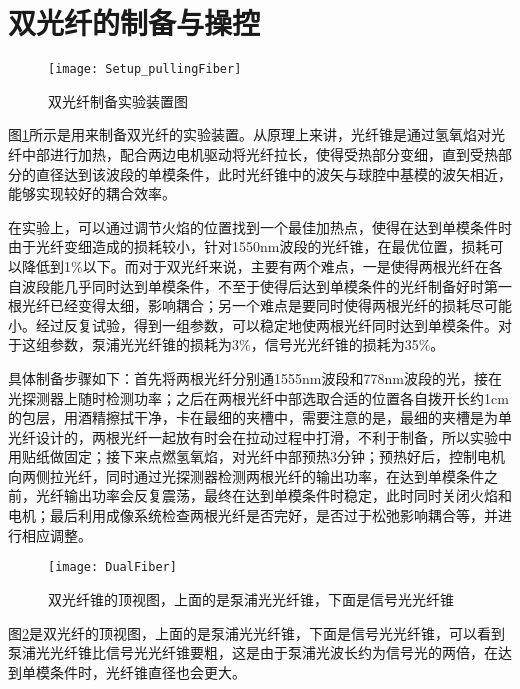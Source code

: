 \section{双光纤的制备与操控}


\begin{figure}
\centering
\texttt{[image: Setup\_pullingFiber]}
\caption{双光纤制备实验装置图}
\label{pic:Setup_pullingFiber}
\end{figure}

图\ref{pic:Setup_pullingFiber}所示是用来制备双光纤的实验装置。从原理上来讲，光纤锥是通过氢氧焰对光纤中部进行加热，配合两边电机驱动将光纤拉长，使得受热部分变细，直到受热部分的直径达到该波段的单模条件，此时光纤锥中的波矢与球腔中基模的波矢相近，能够实现较好的耦合效率。

在实验上，可以通过调节火焰的位置找到一个最佳加热点，使得在达到单模条件时由于光纤变细造成的损耗较小，针对1550nm波段的光纤锥，在最优位置，损耗可以降低到1$\%$以下。而对于双光纤来说，主要有两个难点，一是使得两根光纤在各自波段能几乎同时达到单模条件，不至于使得后达到单模条件的光纤制备好时第一根光纤已经变得太细，影响耦合；另一个难点是要同时使得两根光纤的损耗尽可能小。经过反复试验，得到一组参数，可以稳定地使两根光纤同时达到单模条件。对于这组参数，泵浦光光纤锥的损耗为3$\%$，信号光光纤锥的损耗为35$\%$。

具体制备步骤如下：首先将两根光纤分别通1555nm波段和778nm波段的光，接在光探测器上随时检测功率；之后在两根光纤中部选取合适的位置各自拨开长约1cm的包层，用酒精擦拭干净，卡在最细的夹槽中，需要注意的是，最细的夹槽是为单光纤设计的，两根光纤一起放有时会在拉动过程中打滑，不利于制备，所以实验中用贴纸做固定；接下来点燃氢氧焰，对光纤中部预热3分钟；预热好后，控制电机向两侧拉光纤，同时通过光探测器检测两根光纤的输出功率，在达到单模条件之前，光纤输出功率会反复震荡，最终在达到单模条件时稳定，此时同时关闭火焰和电机；最后利用成像系统检查两根光纤是否完好，是否过于松弛影响耦合等，并进行相应调整。

\begin{figure}
\centering
\texttt{[image: DualFiber]}
\caption{双光纤锥的顶视图，上面的是泵浦光光纤锥，下面是信号光光纤锥}
\label{pic:DualFiber}
\end{figure}

图\ref{pic:DualFiber}是双光纤的顶视图，上面的是泵浦光光纤锥，下面是信号光光纤锥，可以看到泵浦光光纤锥比信号光光纤锥要粗，这是由于泵浦光波长约为信号光的两倍，在达到单模条件时，光纤锥直径也会更大。

